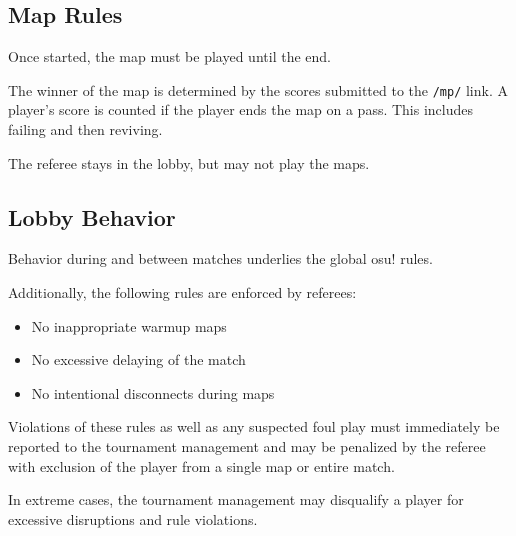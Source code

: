 
\subsection{Map Rules}

Once started, the map must be played until the end.

The winner of the map is determined by the scores submitted to the \texttt{/mp/} link. A player's score is counted if the player ends the map on a pass. This includes failing and then reviving.


The referee stays in the lobby, but may not play the maps.

\subsection{Lobby Behavior}

Behavior during and between matches underlies the global osu! rules.

\begin{samepage}
Additionally, the following rules are enforced by referees:

\begin{itemize}
	\item No inappropriate warmup maps
	\item No excessive delaying of the match
	\item No intentional disconnects during maps
\end{itemize}
\end{samepage}

Violations of these rules as well as any suspected foul play must immediately be reported to the tournament management and may be penalized by the referee with exclusion of the player from a single map or entire match. 

In extreme cases, the tournament management may disqualify a player  for excessive disruptions and rule violations.

